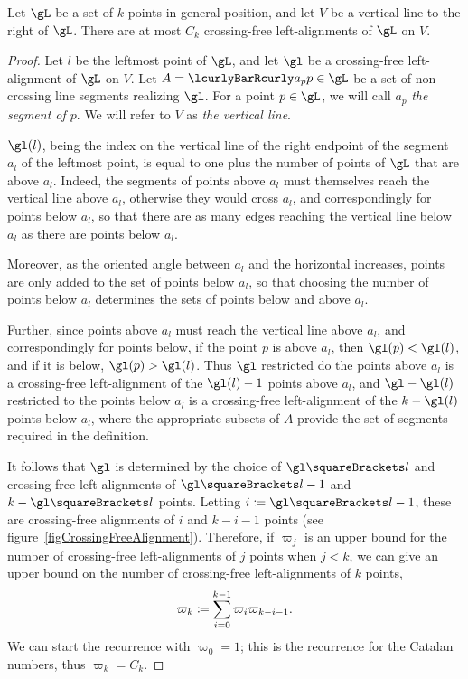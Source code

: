 \documentclass[10pt, a4paper, twoside]{basestyle}
\begin{document}
\begin{lemma}
Let $\gL$ be a set of $k$ points in general position, and let $V$ be a vertical line to the right of $\gL$.
There are at most $C_k$ crossing-free left-alignments of $\gL$ on $V$.
\begin{proof}
Let $l$ be the leftmost point of $\gL$, and let $\gl$ be a crossing-free left-alignment of $\gL$ on $V$.
Let $A=\setst{a_p}{p\in\gL}$ be a set of non-crossing line segments realizing $\gl$.
For a point $p\in\gL$, we will call $a_p$ \emph{the segment of $p$}. We will refer to $V$ as
\emph{the vertical line}.

$\gl(l)$, being the index on the vertical line of the right endpoint of the segment $a_l$ of the leftmost point,
is equal to one plus the number of points of $\gL$ that are above $a_l$. Indeed, the segments of points above $a_l$ must
themselves reach the vertical line above $a_l$, otherwise they would cross $a_l$, and correspondingly for
points below $a_l$, so that there are as many edges reaching the vertical line below $a_l$ as there are points
below $a_l$.

Moreover, as the oriented angle between $a_l$ and the horizontal increases, points are only added to the
set of points below $a_l$, so that choosing the number of points below $a_l$ determines the sets of points
below and above $a_l$.

Further, since points above $a_l$ must reach the vertical line above $a_l$, and correspondingly for points below,
if the point $p$ is above $a_l$, then $\gl(p) < \gl(l)$, and if it is below, $\gl(p) > \gl(l)$. Thus
$\gl$ restricted do the points above $a_l$ is a crossing-free left-alignment of the $\gl(l) - 1$ points above
$a_l$, and $\gl-\gl(l)$ restricted to the points below $a_l$ is a crossing-free left-alignment of the
$k - \gl(l)$ points below $a_l$, where the appropriate subsets of $A$ provide the set of segments required
in the definition.

It follows that $\gl$ is determined by the choice of $\gl\of l$ and crossing-free left-align\-ments
of $\gl\of{l}-1$ and $k-\gl\of{l}$ points.
Letting $i\DefineAs \gl\of l - 1$, these are crossing-free alignments of $i$ and $k-i-1$ points (see
figure~\ref{figCrossingFreeAlignment}).
Therefore, if $\varpi_j$ is an upper bound for the number of crossing-free
left-alignments of $j$ points when $j < k$,
we can give an upper bound on the number of crossing-free left-alignments of $k$ points,
\[\varpi_k\DefineAs\sum{i=0}[k-1]\varpi_{i}\varpi_{k-i-1}\text.\]
We can start the recurrence with $\varpi_0 = 1$; this is the recurrence for the Catalan numbers, thus
$\varpi_k=C_k$.
\end{proof}
\end{lemma}
\end{document}
